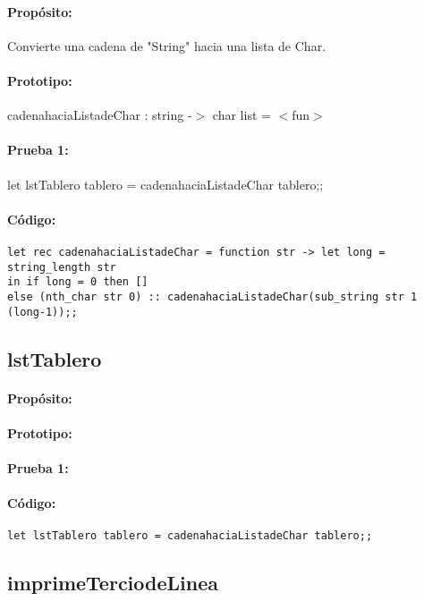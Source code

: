 \paragraph{Propósito:} Convierte una cadena de "String" hacia una lista de Char.
\paragraph{Prototipo:} cadenahaciaListadeChar : string -$>$ char list = $<$fun$>$
\paragraph{Prueba 1:} let lstTablero tablero = cadenahaciaListadeChar tablero;;
\paragraph{Código:}
\begin{verbatim}
let rec cadenahaciaListadeChar = function str -> let long = string_length str
in if long = 0 then []                                                                        
else (nth_char str 0) :: cadenahaciaListadeChar(sub_string str 1 (long-1));;
\end{verbatim}

\subsection{lstTablero}

\paragraph{Propósito:}
\paragraph{Prototipo:}
\paragraph{Prueba 1:}
\paragraph{Código:}
\begin{verbatim}
let lstTablero tablero = cadenahaciaListadeChar tablero;;
\end{verbatim}

\subsection{imprimeTerciodeLinea}

